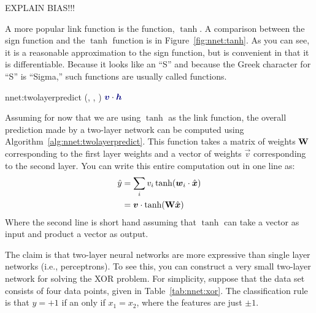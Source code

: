 EXPLAIN BIAS!!!

A more popular link function is the 
function, $\tanh$.  A comparison between the sign function and the
$\tanh$ function is in Figure~\ref{fig:nnet:tanh}.  As you can see, it
is a reasonable approximation to the sign function, but is convenient
in that it is differentiable.  Because it looks like an ``S'' and because the
Greek character for ``S'' is ``Sigma,'' such functions are usually
called  functions.

\newalgorithm%
  {nnet:twolayerpredict}%
  {(, , \VAR{$\hat\vx$})}
  {
\ENDFOR
\RETURN $\dotp{\VARm{\vec v}}{\VARm{\vec h}}$
}


Assuming for now that we are using $\tanh$ as the link function, the
overall prediction made by a two-layer network can be computed using
Algorithm~\ref{alg:nnet:twolayerpredict}.  This function takes a
matrix of weights $\text{\bf W}$ corresponding to the first layer weights
and a vector of weights $\vec v$ corresponding to the second layer.
You can write this entire computation out in one line as:
%
\begin{align}
\hat y
&= \sum_i v_i \tanh( \boldsymbol{w}_i \cdot \hat{{\boldsymbol{x}}} ) \\
&= \boldsymbol{v} \cdot \tanh( \text{\bf W} \hat{{\boldsymbol{x}}} ) \label{eq:nnet:matrixeq}
\end{align}
%
Where the second line is short hand assuming that $\tanh$ can take a
vector as input and product a vector as output.



The claim is that two-layer neural networks are more expressive than
single layer networks (i.e., perceptrons).  To see this, you can
construct a very small two-layer network for solving the XOR problem.
For simplicity, suppose that the data set consists of four data
points, given in Table~\ref{tab:nnet:xor}.  The classification rule is
that $y=+1$ if an only if $x_1=x_2$, where the features are just $\pm
1$.


